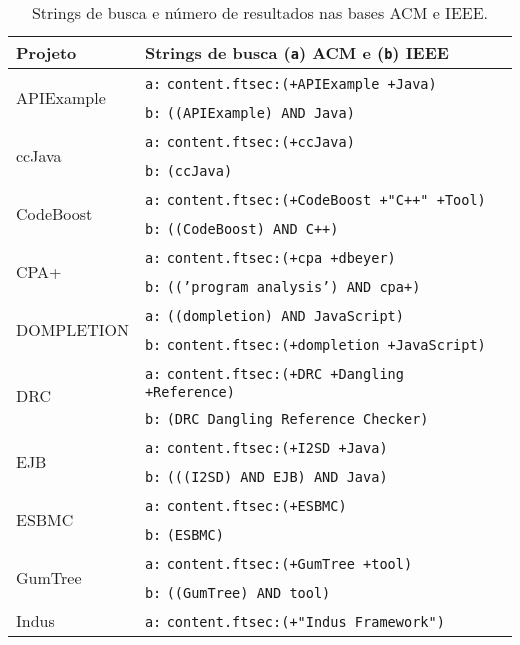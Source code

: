 
\begin{table}[h]
\caption{Strings de busca e número de resultados nas bases ACM e IEEE.}
\centering
\begin{tabular}{l p{10cm} c}
  \hline
  {\bf Projeto} & {\bf Strings de busca (\texttt{a}) ACM e (\texttt{b}) IEEE} \\
  \hline
  \multirow{2}{*}{APIExample}
            & \texttt{a:} \texttt{content.ftsec:(+APIExample +Java)} \\
            & \texttt{b:} \texttt{((APIExample) AND Java)} \\
  \hline
  \multirow{2}{*}{ccJava}
            & \texttt{a:} \texttt{content.ftsec:(+ccJava)} \\
            & \texttt{b:} \texttt{(ccJava)} \\
  \hline
  \multirow{2}{*}{CodeBoost}
            & \texttt{a:} \texttt{content.ftsec:(+CodeBoost +"C++" +Tool)} \\
            & \texttt{b:} \texttt{((CodeBoost) AND C++)} \\
  \hline
  \multirow{2}{*}{CPA+}
            & \texttt{a:} \texttt{content.ftsec:(+cpa +dbeyer)} \\
            & \texttt{b:} \texttt{(('program analysis') AND cpa+)} \\
  \hline
  \multirow{2}{*}{DOMPLETION}
            & \texttt{a:} \texttt{((dompletion) AND JavaScript)} \\
            & \texttt{b:} \texttt{content.ftsec:(+dompletion +JavaScript)} \\
  \hline
  \multirow{2}{*}{DRC}
            & \texttt{a:} \texttt{content.ftsec:(+DRC +Dangling +Reference)} \\
            & \texttt{b:} \texttt{(DRC Dangling Reference Checker)} \\
  \hline
  \multirow{2}{*}{EJB}
            & \texttt{a:} \texttt{content.ftsec:(+I2SD +Java)} \\
            & \texttt{b:} \texttt{(((I2SD) AND EJB) AND Java)} \\
  \hline
  \multirow{2}{*}{ESBMC}
            & \texttt{a:} \texttt{content.ftsec:(+ESBMC)} \\
            & \texttt{b:} \texttt{(ESBMC)} \\
  \hline
  \multirow{2}{*}{GumTree}
            & \texttt{a:} \texttt{content.ftsec:(+GumTree +tool)} \\
            & \texttt{b:} \texttt{((GumTree) AND tool)} \\
  \hline
  \multirow{2}{*}{Indus}
            & \texttt{a:} \texttt{content.ftsec:(+"Indus Framework")} \\

\end{tabular}
\end{table}
